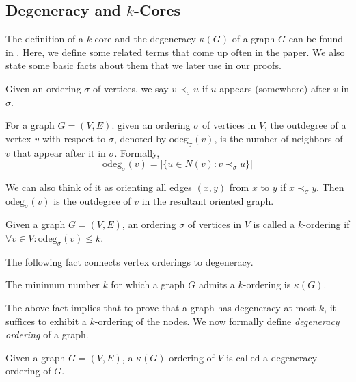 \documentclass[11pt,letterpaper]{article}
\renewcommand{\leq}{\leqslant}
\theoremstyle{definition}
\newcommand{\odeg}{\text{odeg}}
\begin{document}
\subsection{Degeneracy and \texorpdfstring{$k$-Cores}{k-Cores}}

The definition of a $k$-core and the degeneracy $\kappa(G)$ of a graph $G$ can be found in . Here, we define some related terms that come up often in the paper. We also state some basic facts about them that we later use in our proofs. 


Given an ordering $\sigma$ of vertices, we say $v\prec_\sigma u$ if $u$ appears (somewhere) after $v$ in $\sigma$. 

\begin{definition}\label{def:odegordering}
    For a graph $G=(V,E)$. given an ordering $\sigma$ of vertices in $V$, the outdegree of a vertex $v$ with respect to $\sigma$, denoted by $\odeg_{\sigma}(v)$, is the number of neighbors of $v$ that appear after it in $\sigma$. Formally,
$$\odeg_{\sigma}(v) = |\{u\in N(v): v \prec_\sigma u\}|$$ 
\end{definition}

We can also think of it as orienting all edges $(x,y)$ from $x$ to $y$ if $x\prec_\sigma y$. Then $\odeg_\sigma(v)$ is the outdegree of $v$ in the resultant oriented graph. 


\begin{definition}[$k$-ordering]\label{def:k-ordering} 
    Given a graph $G=(V,E)$, an ordering $\sigma$ of vertices in $V$ is called a $k$-ordering if $\forall v\in V: \odeg_\sigma(v)\leq k$.   
\end{definition}

The following fact connects vertex orderings to degeneracy. 

\begin{fact}\label{fact:min-k-ord}
    The minimum number $k$ for which a graph $G$ admits a $k$-ordering is $\kappa(G)$.
\end{fact}


The above fact implies that to prove that a graph has degeneracy at most $k$, it suffices to exhibit a $k$-ordering of the nodes. We now formally define \emph{degeneracy ordering} of a graph.  

\begin{definition} \label{def:degen-ord}
    Given a graph $G=(V,E)$, a $\kappa(G)$-ordering of $V$ is called a degeneracy ordering of $G$.
\end{definition}
\end{document}
